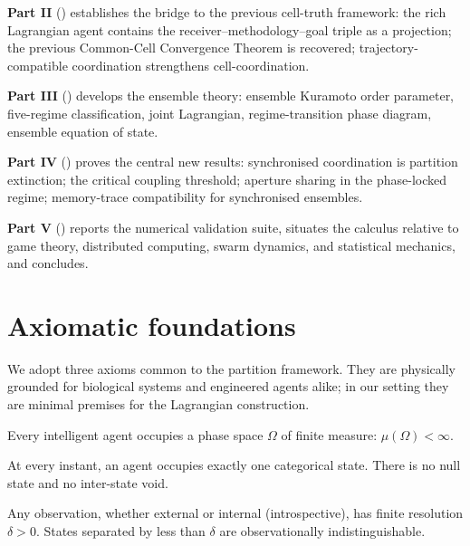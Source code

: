 \documentclass[11pt,twocolumn,a4paper]{article}
\begin{document}
\textbf{Part II} ()
establishes the bridge to the previous cell-truth framework: the rich
Lagrangian agent contains the receiver--methodology--goal triple as a
projection; the previous Common-Cell Convergence Theorem is recovered;
trajectory-compatible coordination strengthens cell-coordination.

\textbf{Part III}
()
develops the ensemble theory: ensemble Kuramoto order parameter,
five-regime classification, joint Lagrangian, regime-transition phase
diagram, ensemble equation of state.

\textbf{Part IV}
()
proves the central new results: synchronised coordination is partition
extinction; the critical coupling threshold; aperture sharing in the
phase-locked regime; memory-trace compatibility for synchronised
ensembles.

\textbf{Part V} ()
reports the numerical validation suite, situates the calculus relative
to game theory, distributed computing, swarm dynamics, and statistical
mechanics, and concludes.

\section{Axiomatic foundations}
\label{sec:axioms}

We adopt three axioms common to the partition framework. They are
physically grounded for biological systems and engineered agents alike;
in our setting they are minimal premises for the Lagrangian
construction.

\begin{axiom}\label{ax:bounded}
Every intelligent agent occupies a phase space $\Omega$ of finite
measure: $\mu(\Omega)<\infty$.
\end{axiom}

\begin{axiom}\label{ax:null}
At every instant, an agent occupies exactly one categorical state.
There is no null state and no inter-state void.
\end{axiom}

\begin{axiom}\label{ax:resolution}
Any observation, whether external or internal (introspective), has
finite resolution $\delta>0$. States separated by less than $\delta$
are observationally indistinguishable.
\end{axiom}
\end{document}
